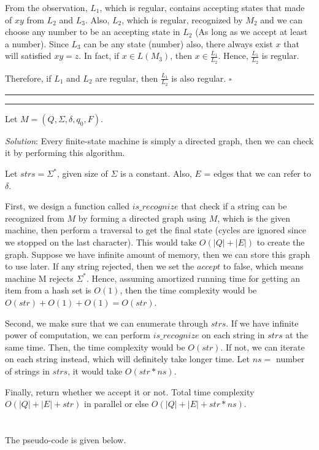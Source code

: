 \documentclass[a4paper, 11pt]{article}
\newcommand{\question}[2] {\vspace{.25in} \hrule\vspace{0.5em}
	\noindent{\bf #1: #2} \vspace{0.5em}
	\hrule \vspace{.10in}}
\begin{document}
	From the observation, $L_1$, which is regular, contains accepting states that made of $xy$ from $L_2$ and $L_3$. Also, $L_2$, which is regular, recognized by $M_2$ and we can choose any number to be an accepting state in $L_2$ (As long as we accept at least a number). Since $L_3$ can be any state (number) also, there always exist $x$ that will satisfied $xy = z$. In fact, if $x \in L(M_3)$, then $x \in \frac{L_1}{L_2}$. Hence, $\frac{L_1}{L_2}$ is regular.
	
	Therefore, if $L_1$ and $L_2$ are regular, then $\frac{L_1}{L_2}$ is also regular. $\square$
	
	\question{5}{Does It Accept Everything?}
	Let $M = (Q, \Sigma, \delta, q_0, F)$.
	
	{\em Solution}: Every finite-state machine is simply a directed graph, then we can check it by performing this algorithm.
	
	Let $strs = \Sigma^*$, given size of $\Sigma$ is a constant. Also, $E$ = edges that we can refer to $\delta$.
	
	First, we design a function called $is\_recognize$ that check if a string can be recognized from $M$ by forming a directed graph using $M$, which is the given machine, then perform a traversal to get the final state (cycles are ignored since we stopped on the last character). This would take $O(|Q|+|E|)$ to create the graph. Suppose we have infinite amount of memory, then we can store this graph to use later. If any string rejected, then we set the $accept$ to false, which means machine M rejects $\Sigma^*$. Hence, assuming amortized running time for getting an item from a hash set is $O(1)$, then the time complexity would be $O(str)+O(1)+O(1) = O(str)$.
	
	Second, we make sure that we can enumerate through $strs$. If we have infinite power of computation, we can perform $is\_recognize$ on each string in $strs$ at the same time. Then, the time complexity would be $O(str)$. If not, we can iterate on each string instead, which will definitely take longer time. Let $ns =$ number of strings in $strs$, it would take $O(str*{ns})$.
	
	Finally, return whether we accept it or not. Total time complexity $O(|Q|+|E|+str)$ in parallel or else $O(|Q|+|E|+str*{ns})$.
	\\\\\\
	The pseudo-code is given below.
	
\end{document}
